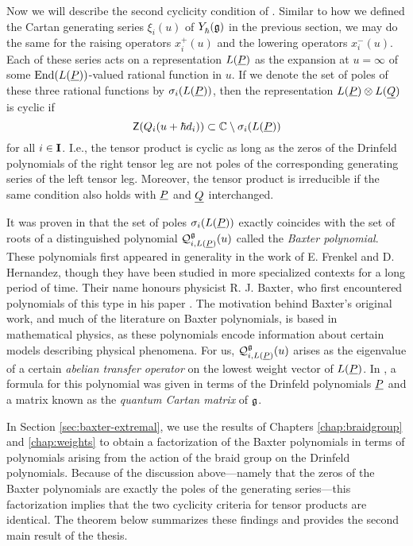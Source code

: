 Now we will describe the second cyclicity condition of \cite{gautam_poles_2023}.
Similar to how we defined the Cartan generating series $\xi_i(u)$ of $Y_\hbar^{}(\mathfrak{g})$ in the previous section, we may do the same for the raising operators $x^+_i(u)$ and the lowering operators $x^-_i(u)$.
Each of these series acts on a representation $L(\underline{P})$ as the expansion at $u=\infty$ of some $\operatorname{End}(L(\underline{P}))$-valued rational function in $u$.
If we denote the set of poles of these three rational functions by $\sigma_i(L(\underline{P}))$, then the representation $L(\underline{P})\otimes L(\underline{Q})$ is cyclic if
\[\mathsf{Z}(Q_i(u+\hbar d_i))\subset\mathbb{C}\setminus\sigma_i(L(\underline{P}))\]
for all $i\in\mathbf{I}$.
I.e., the tensor product is cyclic as long as the zeros of the Drinfeld polynomials of the right tensor leg are not poles of the corresponding generating series of the left tensor leg.
Moreover, the tensor product is irreducible if the same condition also holds with $\underline{P}$ and $\underline{Q}$ interchanged.

It was proven in \cite{gautam_poles_2023} that the set of poles $\sigma_i(L(\underline{P}))$ exactly coincides with the set of roots of a distinguished polynomial $\mathcal{Q}_{i,L(\underline{P})}^{\mathfrak{g}}(u)$ called the \emph{Baxter polynomial}.
These polynomials first appeared in generality in the work \cite{frenkel_baxters_2015} of E. Frenkel and D. Hernandez, though they have been studied in more specialized contexts for a long period of time.
Their name honours physicist R. J. Baxter, who first encountered polynomials of this type in his paper \cite{baxter_partition_1972}.
The motivation behind Baxter's original work, and much of the literature on Baxter polynomials, is based in mathematical physics, as these polynomials encode information about certain models describing physical phenomena.
For us, $\mathcal{Q}_{i,L(\underline{P})}^{\mathfrak{g}}(u)$ arises as the eigenvalue of a certain \emph{abelian transfer operator} on the lowest weight vector of $L(\underline{P})$.
In \cite{gautam_poles_2023}, a formula for this polynomial was given in terms of the Drinfeld polynomials $\underline{P}$ and a matrix known as the \emph{quantum Cartan matrix} of $\mathfrak{g}$.

In Section \ref{sec:baxter-extremal}, we use the results of Chapters \ref{chap:braidgroup} and \ref{chap:weights} to obtain a factorization of the Baxter polynomials in terms of polynomials arising from the action of the braid group on the Drinfeld polynomials.
Because of the discussion above---namely that the zeros of the Baxter polynomials are exactly the poles of the generating series---this factorization implies that the two cyclicity criteria for tensor products are identical.
The theorem below summarizes these findings and provides the second main result of the thesis.

